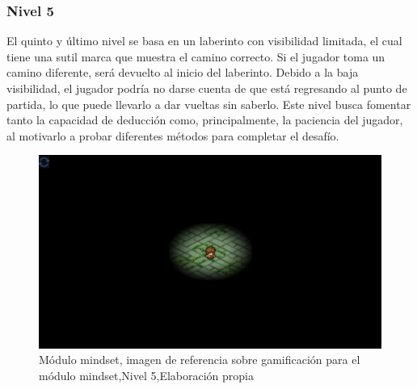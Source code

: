 \subsubsection{Nivel 5}
El quinto y último nivel se basa en un laberinto con visibilidad limitada, el cual tiene una sutil marca que muestra el camino correcto. Si el jugador toma un camino diferente, será devuelto al inicio del laberinto. Debido a la baja visibilidad, el jugador podría no darse cuenta de que está regresando al punto de partida, lo que puede llevarlo a dar vueltas sin saberlo. Este nivel busca fomentar tanto la capacidad de deducción como, principalmente, la paciencia del jugador, al motivarlo a probar diferentes métodos para completar el desafío.

\begin{figure}[H]
  \centering
  \includegraphics[width=0.7\linewidth]{Imagenes/Nivel5.png}
  \caption{Módulo mindset, imagen de referencia sobre gamificación para el módulo mindset,Nivel 5,Elaboración propia}
  \label{fig:imagen1mindset}
\end{figure}
